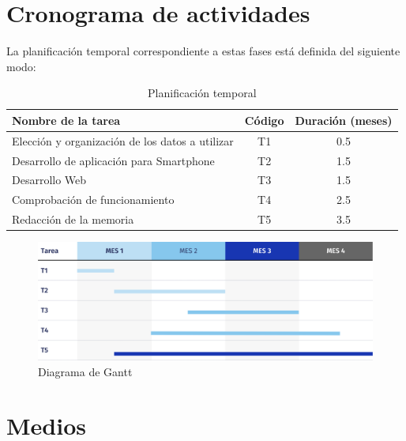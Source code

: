 \documentclass[12pt,oneside,a4paper]{article}
\begin{document}
\newpage

\section{Cronograma de actividades}
\hline

La planificación temporal correspondiente a estas fases está definida del siguiente modo: 
\begin{table}[H]
\begin{tabular}{|l|c|c|}
\hline
 \cellcolor[HTML]{DAE8FC}Nombre de la tarea& \multicolumn{1}{|l|}{\cellcolor[HTML]{DAE8FC}Código} & \multicolumn{1}{|l|}{\cellcolor[HTML]{DAE8FC}Duración (meses)}   \\ \hline
 Elección y organización de los datos a utilizar& T1&                                                   0.5\\ \hline
                              Desarrollo de aplicación para Smartphone& T2&                                                   1.5\\ \hline   Desarrollo Web& T3& 1.5\\ \hline   Comprobación de funcionamiento&                                                    T4& 2.5\\ \hline
                              Redacción de la memoria                           &                                                    T5& 3.5\\ \hline
\end{tabular}
\caption{Planificación temporal}
\end{table}

\begin{figure}[H]
  \centering
  \includegraphics[width=15cm]{anteproyecto/figuras/TareaS_GANTT.png}
  \caption{Diagrama de Gantt}
  \label{fig:ejemplo}
\end{figure}


\section{Medios}
\hline
\end{document}
